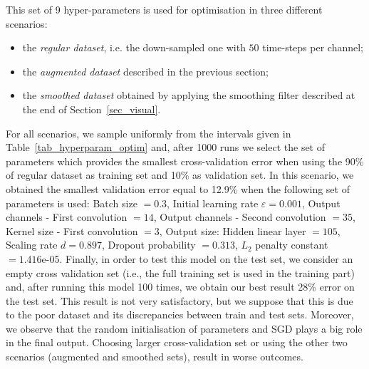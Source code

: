 \documentclass{article}
\begin{document}
This set of 9  hyper-parameters is used for optimisation in three different scenarios: 
\begin{itemize}
\item the \emph{regular dataset}, i.e. the down-sampled one with $50$ time-steps per channel; 
\item the \emph{augmented dataset} described in the previous section;%
\item the \emph{smoothed dataset} obtained  by applying the smoothing filter described at the end of Section~\ref{sec_visual}.
\end{itemize}
For all scenarios, we sample uniformly from the intervals given in Table~\ref{tab_hyperparam_optim} and, after 1000 runs we select the set of parameters which provides the smallest cross-validation error when using the 90\% of regular dataset as training set and 10\% as validation set.
In this scenario, we obtained the smallest validation error equal to 12.9\%  when the following set of parameters is used:
Batch size $ =  0.3$,  Initial learning rate $\varepsilon  = 0.001$,  Output channels - First convolution  $= 14$, Output channels - Second convolution $= 35$, Kernel size - First convolution $= 3$, Output size: Hidden linear layer $ = 105$,  Scaling rate $d = 0.897$, Dropout probability $=  0.313$,  $L_2$ penalty constant $= 1.416$e-05.
Finally, in order to test this model on the test set, we consider an empty cross validation set (i.e., the full training set is used in the training part) and, after running this model 100 times, we obtain our best result  28\% error on the test set.
This result is not very satisfactory, but we suppose that this is due to the poor dataset and its discrepancies between train and test sets. 
 Moreover, we observe that the random initialisation of parameters and SGD plays a big role in the final output. 
Choosing larger cross-validation set or using  the other two scenarios (augmented  and smoothed sets), result in worse outcomes. 
  
\end{document}
